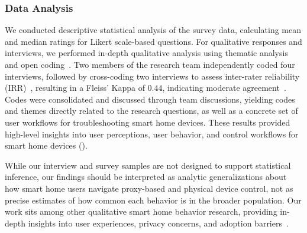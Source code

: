 \subsubsection{Data Analysis}
We conducted descriptive statistical analysis of the survey data, calculating mean and median ratings for Likert scale-based questions. For qualitative responses and interviews, we performed in-depth qualitative analysis using thematic analysis and open coding~\cite{khandkar2009open, deterding2021flexible}. Two members of the research team independently coded four interviews, followed by cross-coding two interviews to assess inter-rater reliability (IRR)~\cite{hallgren2012computing}, resulting in a Fleiss' Kappa of $0.44$, indicating moderate agreement~\cite{falotico2015fleiss}. 
Codes were consolidated and discussed through team discussions, yielding codes and themes directly related to the research questions, as well as a concrete set of user workflows for troubleshooting smart home devices. These results provided high-level insights into user perceptions, user behavior, and control workflows for smart home devices (). 

While our interview and survey samples are not designed to support statistical inference, our findings should be interpreted as analytic generalizations about how smart home users navigate proxy-based and physical device control, not as precise estimates of how common each behavior is in the broader population. Our work sits among other qualitative smart home behavior research, providing in-depth insights into user experiences, privacy concerns, and adoption barriers~\cite{dermody2025multi, zheng2018user}.

